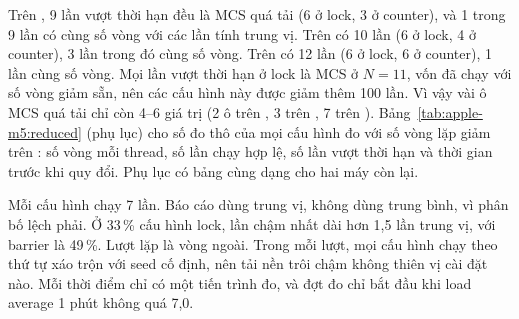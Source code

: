 Trên , 9 lần vượt thời hạn đều là MCS quá tải (6 ở lock, 3 ở counter), và 1 trong 9
lần có cùng số vòng với các lần tính trung vị. Trên  có 10 lần (6 ở lock, 4 ở
counter), 3 lần trong đó cùng số vòng. Trên  có 12 lần (6 ở lock, 6 ở counter), 1 lần
cùng số vòng. Mọi lần vượt thời hạn ở lock là MCS ở $N=11$, vốn đã chạy với số vòng giảm sẵn, nên các
cấu hình này được giảm thêm 100 lần. Vì vậy vài ô MCS quá tải chỉ còn 4--6 giá trị (2 ô trên
, 3 trên , 7 trên ). Bảng~\ref{tab:apple-m5:reduced}
(phụ lục) cho số đo thô của mọi cấu hình đo với số vòng lặp giảm trên : số vòng mỗi
thread, số lần chạy hợp lệ, số lần vượt thời hạn và thời gian trước khi quy đổi. Phụ lục có bảng cùng dạng
cho hai máy còn lại.

Mỗi cấu hình chạy 7 lần. Báo cáo dùng trung vị, không dùng trung bình, vì phân bố lệch phải. Ở
33\,\% cấu hình lock, lần chậm nhất dài hơn 1,5 lần trung vị, với barrier là 49\,\%. Lượt lặp là vòng
ngoài. Trong mỗi lượt, mọi cấu hình chạy theo thứ tự xáo trộn với seed cố định, nên tải nền trôi chậm
không thiên vị cài đặt nào. Mỗi thời điểm chỉ có một tiến trình đo, và đợt đo chỉ bắt đầu khi load
average 1 phút không quá 7,0.

